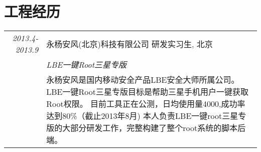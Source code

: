\documentclass[a4paper,10pt]{article} %
\begin{document}
\section{工程经历}
\begin{tabular}{r|p{11cm}}

\emph{2013.4-2013.9} &  \textsc{永杨安风(北京)科技有限公司 研发实习生}, 北京 \smallskip\smallskip\\
& \emph{LBE一键Root三星专版} \smallskip\\
& \footnotesize{
永杨安风是国内移动安全产品LBE安全大师所属公司。\linebreak
LBE一键Root三星专版目标是帮助三星手机用户一键获取Root权限。
目前工具正在公测，日均使用量4000,成功率达到80\%（截止2013年8月)
本人负责LBE一键root三星专版的大部分研发工作，完整构建了整个root系统的脚本后端。

}
\end{tabular}
\end{document}
